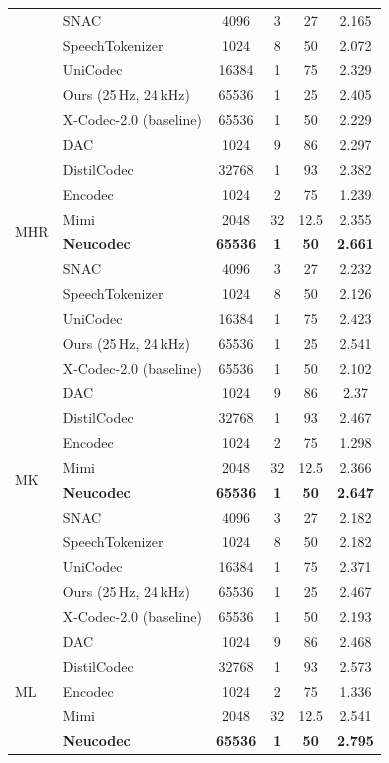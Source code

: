 \documentclass[preprint]{article}
\begin{document}
\begin{longtable}{llcccc}
  & SNAC & 4096 & 3 & 27 & 2.165 \\
  & SpeechTokenizer & 1024 & 8 & 50 & 2.072 \\
  & UniCodec & 16384 & 1 & 75 & 2.329 \\
  & Ours (25\,Hz, 24\,kHz) & 65536 & 1 & 25 & 2.405 \\
  & X-Codec-2.0 (baseline) & 65536 & 1 & 50 & 2.229 \\
\midrule
\multirow{8}{*}{MHR}
  & DAC & 1024 & 9 & 86 & 2.297 \\
  & DistilCodec & 32768 & 1 & 93 & 2.382 \\
  & Encodec & 1024 & 2 & 75 & 1.239 \\
  & Mimi & 2048 & 32 & 12.5 & 2.355 \\
  & \textbf{Neucodec} & \textbf{65536} & \textbf{1} & \textbf{50} & \textbf{2.661} \\
  & SNAC & 4096 & 3 & 27 & 2.232 \\
  & SpeechTokenizer & 1024 & 8 & 50 & 2.126 \\
  & UniCodec & 16384 & 1 & 75 & 2.423 \\
  & Ours (25\,Hz, 24\,kHz) & 65536 & 1 & 25 & 2.541 \\
  & X-Codec-2.0 (baseline) & 65536 & 1 & 50 & 2.102 \\
\midrule
\multirow{8}{*}{MK}
  & DAC & 1024 & 9 & 86 & 2.37 \\
  & DistilCodec & 32768 & 1 & 93 & 2.467 \\
  & Encodec & 1024 & 2 & 75 & 1.298 \\
  & Mimi & 2048 & 32 & 12.5 & 2.366 \\
  & \textbf{Neucodec} & \textbf{65536} & \textbf{1} & \textbf{50} & \textbf{2.647} \\
  & SNAC & 4096 & 3 & 27 & 2.182 \\
  & SpeechTokenizer & 1024 & 8 & 50 & 2.182 \\
  & UniCodec & 16384 & 1 & 75 & 2.371 \\
  & Ours (25\,Hz, 24\,kHz) & 65536 & 1 & 25 & 2.467 \\
  & X-Codec-2.0 (baseline) & 65536 & 1 & 50 & 2.193 \\
\midrule
\multirow{8}{*}{ML}
  & DAC & 1024 & 9 & 86 & 2.468 \\
  & DistilCodec & 32768 & 1 & 93 & 2.573 \\
  & Encodec & 1024 & 2 & 75 & 1.336 \\
  & Mimi & 2048 & 32 & 12.5 & 2.541 \\
  & \textbf{Neucodec} & \textbf{65536} & \textbf{1} & \textbf{50} & \textbf{2.795} \\

\end{longtable}
\end{document}
